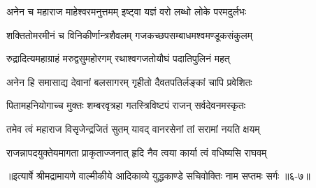 \twolineshloka
{अनेन च महाराज माहेश्वरमनुत्तमम्}
{इष्ट्वा यज्ञं वरो लब्धो लोके परमदुर्लभः} %

\twolineshloka
{शक्तितोमरमीनं च विनिकीर्णान्त्रशैवलम्}
{गजकच्छपसम्बाधमश्वमण्डूकसंकुलम्} %

\twolineshloka
{रुद्रादित्यमहाग्राहं मरुद्वसुमहोरगम्}
{रथाश्वगजतोयौघं पदातिपुलिनं महत्} %

\twolineshloka
{अनेन हि समासाद्य देवानां बलसागरम्}
{गृहीतो दैवतपतिर्लङ्कां चापि प्रवेशितः} %

\twolineshloka
{पितामहनियोगाच्च मुक्तः शम्बरवृत्रहा}
{गतस्त्रिविष्टपं राजन् सर्वदेवनमस्कृतः} %

\twolineshloka
{तमेव त्वं महाराज विसृजेन्द्रजितं सुतम्}
{यावद् वानरसेनां तां सरामां नयति क्षयम्} %

\twolineshloka
{राजन्नापदयुक्तेयमागता प्राकृताज्जनात्}
{हृदि नैव त्वया कार्या त्वं वधिष्यसि राघवम्} %


॥इत्यार्षे श्रीमद्रामायणे वाल्मीकीये आदिकाव्ये युद्धकाण्डे सचिवोक्तिः नाम सप्तमः सर्गः ॥६-७॥
